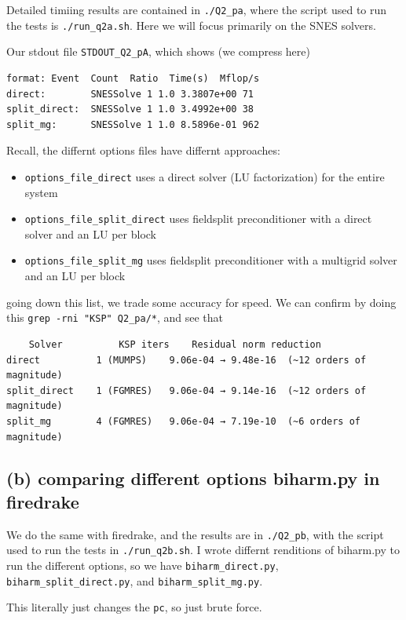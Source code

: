 \documentclass[12pt]{article}
\begin{document}
Detailed timiing results are contained in \texttt{./Q2\_pa}, where the script used to run the tests is \texttt{./run\_q2a.sh}. Here we will focus primarily on the SNES solvers. 

Our stdout file \texttt{STDOUT\_Q2\_pA}, which shows (we compress here)
\begin{verbatim}
format: Event  Count  Ratio  Time(s)  Mflop/s
direct:        SNESSolve 1 1.0 3.3807e+00 71
split_direct:  SNESSolve 1 1.0 3.4992e+00 38
split_mg:      SNESSolve 1 1.0 8.5896e-01 962
\end{verbatim}

Recall, the differnt options files have differnt approaches: 

\begin{itemize}
    \item \texttt{options\_file\_direct} uses a direct solver (LU factorization) for the entire system
    \item \texttt{options\_file\_split\_direct} uses fieldsplit preconditioner with a direct solver and an LU per block
    \item  \texttt{options\_file\_split\_mg} uses fieldsplit preconditioner with a multigrid solver and an LU per block
\end{itemize}

going down this list, we trade some accuracy for speed. We can confirm by doing this \texttt{grep -rni "KSP" Q2\_pa/*}, and see that 
\begin{verbatim}
    Solver          KSP iters    Residual norm reduction
direct          1 (MUMPS)    9.06e-04 → 9.48e-16  (~12 orders of magnitude)
split_direct    1 (FGMRES)   9.06e-04 → 9.14e-16  (~12 orders of magnitude)
split_mg        4 (FGMRES)   9.06e-04 → 7.19e-10  (~6 orders of magnitude)
\end{verbatim}
\subsection{(b) comparing different options biharm.py in firedrake}

We do the same with firedrake, and the results are in \texttt{./Q2\_pb}, with the script used to run the tests in \texttt{./run\_q2b.sh}. I wrote differnt renditions of biharm.py to run the different options, so we have \texttt{biharm\_direct.py}, \texttt{biharm\_split\_direct.py}, and \texttt{biharm\_split\_mg.py}. 

This literally just changes the \texttt{pc}, so just brute force.
\end{document}
